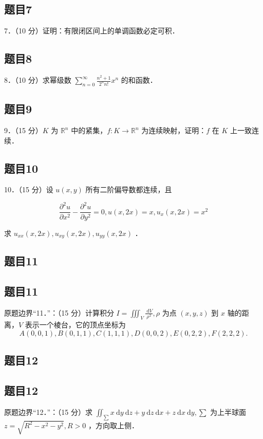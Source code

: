 \documentclass{article}
\begin{document}
\subsection{题目7}
7．（10 分）证明：有限闭区间上的单调函数必定可积．

\subsection{题目8}
8．（10 分）求幂级数 \(\sum_{n=0}^{\infty} \frac{n^{2}+1}{2^{n} n!} x^{n}\) 的和函数．

\subsection{题目9}
9．（15 分）\(K\) 为 \(\mathbb{R}^{n}\) 中的紧集，\(f: K \rightarrow \mathbb{R}^{n}\) 为连续映射，证明：\(f\) 在 \(K\) 上一致连续．

\subsection{题目10}
10．（15 分）设 \(u(x, y)\) 所有二阶偏导数都连续，且

\[
\frac{\partial^{2} u}{\partial x^{2}}-\frac{\partial^{2} u}{\partial y^{2}}=0, u(x, 2 x)=x, u_{x}(x, 2 x)=x^{2}
\]

求 \(u_{x x}(x, 2 x), u_{x y}(x, 2 x), u_{y y}(x, 2 x)\) ．

\begin{itemize}

\subsection{题目11}
\end{itemize}

\subsection{题目11}
原题边界“11．”：（15 分）计算积分 \(I=\iiint_{V} \frac{\mathrm{~d} V}{\rho^{2}}, \rho\) 为点 \((x, y, z)\) 到 \(x\) 轴的距离，\(V\) 表示一个棱台，它的顶点坐标为
\[
A(0,0,1), B(0,1,1), C(1,1,1), D(0,0,2), E(0,2,2), F(2,2,2) .
\]

\subsection{题目12}

\subsection{题目12}
原题边界“12．”：（15 分）求 \(\iint_{\sum} x \mathrm{~d} y \mathrm{~d} z+y \mathrm{~d} z \mathrm{~d} x+z \mathrm{~d} x \mathrm{~d} y, \sum\) 为上半球面 \(z=\sqrt{R^{2}-x^{2}-y^{2}}, R>0\) ，方向取上侧．
\end{document}
